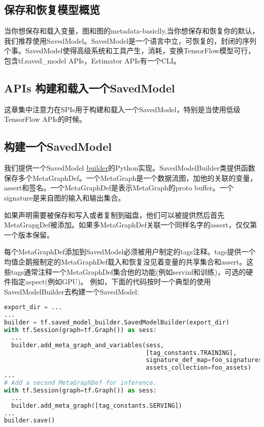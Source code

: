 \subsection{保存和恢复模型概览}
当你想保存和载入变量，图和图的metadata-basiclly,当你想保存和恢复你的默认，我们推荐使用SavedModel。SavedModel是一个语言中立，可恢复的，封闭的序列个事。SavedModel使得高级系统和工具产生，消耗，变换TensorFlow模型可行，包含tf.saved\_model APIs，Estimator APIs有一个CLI。
\subsection{APIs 构建和载入一个SavedModel}
这章集中注意力在SPIs用于构建和载入一个SavedModel，特别是当使用低级TensorFlow APIs的时候。
\subsection{构建一个SavedModel}
我们提供一个SavedModel \href{https://www.tensorflow.org/api_docs/python/tf/saved_model/builder?hl=zh-cn}{builder}的Python实现。SavedModelBuilder类提供函数保存多个MetaGraphDef。一个MetaGraph是一个数据流图，加他的关联的变量，assert和签名。一个MetaGraphDef是表示MetaGraph的proto buffer。一个signature是来自图的输入和输出集合。

如果声明需要被保存和写入或者复制到磁盘，他们可以被提供然后首先MetaGrapgDef被添加。如果多MetaGraphDef关联一个同样名字的assert，仅仅第一个版本保留。

每个MetaGraphDef添加到SavedModel必须被用户制定的tags注释。tags提供一个均值企鹅报制定的MetaGraphDef载入和恢复没见着变量的共享集合和assert。这些tags通常注释一个MetaGraphDef集合他的功能(例如servinf和训练)，可选的硬件指定aspect(例如GPU)。
例如，下面的代码按时一个典型的使用SavedModelBuilder去构建一个SavedModel:
\begin{lstlisting}[language=Python]
export_dir = ...
...
builder = tf.saved_model_builder.SavedModelBuilder(export_dir)
with tf.Session(graph=tf.Graph()) as sess:
  ...
  builder.add_meta_graph_and_variables(sess,
                                       [tag_constants.TRAINING],
                                       signature_def_map=foo_signatures,
                                       assets_collection=foo_assets)
...
# Add a second MetaGraphDef for inference.
with tf.Session(graph=tf.Graph()) as sess:
  ...
  builder.add_meta_graph([tag_constants.SERVING])
...
builder.save()
\end{lstlisting}
